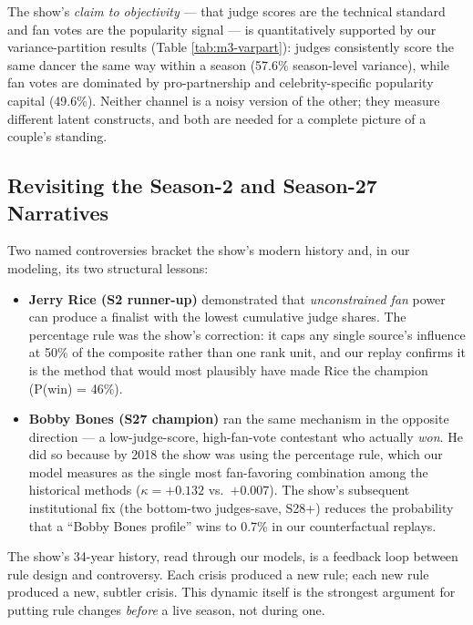 \documentclass{article}
\begin{document}
The show's \emph{claim to objectivity} --- that judge scores are the technical standard and fan votes are the popularity signal --- is quantitatively supported by our variance-partition results (Table \ref{tab:m3-varpart}): judges consistently score the same dancer the same way within a season (57.6\% season-level variance), while fan votes are dominated by pro-partnership and celebrity-specific popularity capital (49.6\%). Neither channel is a noisy version of the other; they measure different latent constructs, and both are needed for a complete picture of a couple's standing.

\subsection{Revisiting the Season-2 and Season-27 Narratives}

Two named controversies bracket the show's modern history and, in our modeling, its two structural lessons:
\begin{itemize}
  \item \textbf{Jerry Rice (S2 runner-up)} demonstrated that \emph{unconstrained fan }power can produce a finalist with the lowest cumulative judge shares. The percentage rule was the show's correction: it caps any single source's influence at 50\% of the composite rather than one rank unit, and our replay confirms it is the method that would most plausibly have made Rice the champion (P(win) = 46\%).
  \item \textbf{Bobby Bones (S27 champion)} ran the same mechanism in the opposite direction --- a low-judge-score, high-fan-vote contestant who actually \emph{won}. He did so because by 2018 the show was using the percentage rule, which our model measures as the single most fan-favoring combination among the historical methods ($\kappa = +0.132$ vs.\ $+0.007$). The show's subsequent institutional fix (the bottom-two judges-save, S28+) reduces the probability that a ``Bobby Bones profile'' wins to 0.7\% in our counterfactual replays.
\end{itemize}
The show's 34-year history, read through our models, is a feedback loop between rule design and controversy. Each crisis produced a new rule; each new rule produced a new, subtler crisis. This dynamic itself is the strongest argument for putting rule changes \emph{before} a live season, not during one.
\end{document}
